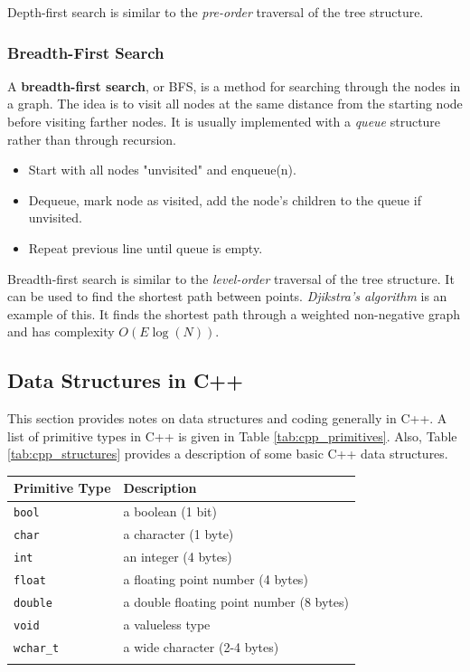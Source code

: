 Depth-first search is similar to the \textit{pre-order} traversal of the tree structure. 

\subsubsection{Breadth-First Search}

A \textbf{breadth-first search}, or BFS, is a method for searching through the nodes in a graph. The idea is to visit all nodes at the same distance from the starting node before visiting farther nodes. It is usually implemented with a \textit{queue} structure rather than through recursion. 

\begin{itemize}
	\item Start with all nodes "unvisited" and enqueue(n). 
	\item Dequeue, mark node as visited, add the node's children to the queue if unvisited. 
	\item Repeat previous line until queue is empty. 
\end{itemize}

Breadth-first search is similar to the \textit{level-order} traversal of the tree structure. It can be used to find the shortest path between points. \textit{Djikstra's algorithm} is an example of this. It finds the shortest path through a weighted non-negative graph and has complexity $O(E \log(N))$.

\subsection{Data Structures in C++}

This section provides notes on data structures and coding generally in C++. A list of primitive types in C++ is given in Table \ref{tab:cpp_primitives}. Also, Table \ref{tab:cpp_structures} provides a description of some basic C++ data structures. \\

\begin{tabular}{p{} p{}}
	\textbf{Primitive Type} & \textbf{Description} \\
	\hline
	\texttt{bool} & a boolean (1 bit) \\
	\texttt{char} & a character (1 byte) \\
	\texttt{int} & an integer (4 bytes) \\
	\texttt{float} & a floating point number (4 bytes) \\
	\texttt{double} & a double floating point number (8 bytes) \\
	\texttt{void} & a valueless type \\
	\texttt{wchar\_t} & a wide character (2-4 bytes) \\
	\hline
	\label{tab:cpp_primitives}
\end{tabular} \\

